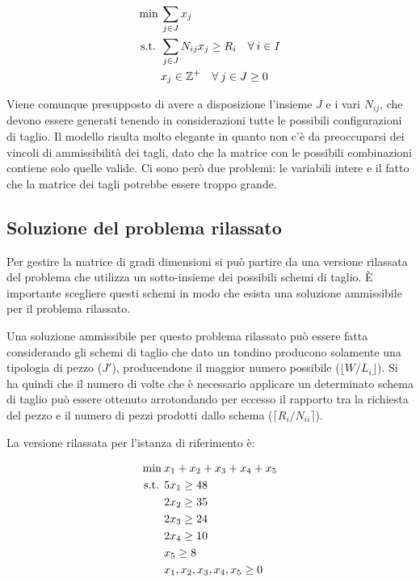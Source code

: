 \begin{align*}
\min\:& \sum\limits_{j \in J} x_j  \\
\text{s.t. }  & \sum\limits_{j \in J} N_{ij}x_j \geq R_i  \quad \forall\: i \in I\\
& x_j \in \mathbb{Z}^+ \quad \forall \: j \in J \geq 0
\end{align*}

Viene comunque presupposto di avere a disposizione l'insieme $J$ e i vari $N_{ij}$, che devono essere generati tenendo in considerazioni tutte le possibili configurazioni di taglio.
Il modello risulta molto elegante in quanto non c'è da preoccuparsi dei vincoli di ammissibilità dei tagli, dato che la matrice con le possibili combinazioni contiene solo quelle valide. Ci sono però due problemi: le variabili intere e il fatto che la matrice dei tagli potrebbe essere troppo grande.

\subsection{Soluzione del problema rilassato}

Per gestire la matrice di gradi dimensioni si può partire da una versione rilassata del problema che utilizza un sotto-insieme dei possibili schemi di taglio. \`E importante scegliere questi schemi in modo che esista una soluzione ammissibile per il problema rilassato.

Una soluzione ammissibile per questo problema rilassato può essere fatta considerando gli schemi di taglio che dato un tondino producono solamente una tipologia di pezzo ($J'$), producendone il maggior numero possibile ($\lfloor W /L_i \rfloor$).
Si ha quindi che il numero di volte che è necessario applicare un determinato schema di taglio può essere ottenuto arrotondando per eccesso il rapporto tra la richiesta del pezzo e il numero di pezzi prodotti dallo schema ($\lceil R_i /N_{ii} \rceil$).

La versione rilassata per l'istanza di riferimento è:

\begin{align*}
\min\:& x_1+x_2+x_3+x_4+x_5 \\
\text{s.t. } &5x_1 \geq 48 \\
	&2x_2 \geq 35 \\
	&2x_3 \geq 24 \\
	&2x_4 \geq 10 \\
	&x_5 \geq 8 \\
	&x_1,x_2,x_3,x_4,x_5\geq 0 \\
\end{align*}

